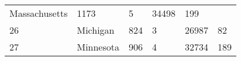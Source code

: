 \documentclass[]{article}
\begin{document}
\begin{longtable}[]{@{}llllll@{}}
\begin{minipage}[t]{0.17\columnwidth}
Massachusetts\strut
\end{minipage} & \begin{minipage}[t]{0.16\columnwidth}\raggedright
1173\strut
\end{minipage} & \begin{minipage}[t]{0.12\columnwidth}\raggedright
5\strut
\end{minipage} & \begin{minipage}[t]{0.18\columnwidth}\raggedright
34498\strut
\end{minipage} & \begin{minipage}[t]{0.14\columnwidth}\raggedright
199\strut
\end{minipage}\tabularnewline
\begin{minipage}[t]{0.05\columnwidth}\raggedright
26\strut
\end{minipage} & \begin{minipage}[t]{0.17\columnwidth}\raggedright
Michigan\strut
\end{minipage} & \begin{minipage}[t]{0.16\columnwidth}\raggedright
824\strut
\end{minipage} & \begin{minipage}[t]{0.12\columnwidth}\raggedright
3\strut
\end{minipage} & \begin{minipage}[t]{0.18\columnwidth}\raggedright
26987\strut
\end{minipage} & \begin{minipage}[t]{0.14\columnwidth}\raggedright
82\strut
\end{minipage}\tabularnewline
\begin{minipage}[t]{0.05\columnwidth}\raggedright
27\strut
\end{minipage} & \begin{minipage}[t]{0.17\columnwidth}\raggedright
Minnesota\strut
\end{minipage} & \begin{minipage}[t]{0.16\columnwidth}\raggedright
906\strut
\end{minipage} & \begin{minipage}[t]{0.12\columnwidth}\raggedright
4\strut
\end{minipage} & \begin{minipage}[t]{0.18\columnwidth}\raggedright
32734\strut
\end{minipage} & \begin{minipage}[t]{0.14\columnwidth}\raggedright
189\strut
\end{minipage}\tabularnewline

\end{longtable}
\end{document}
